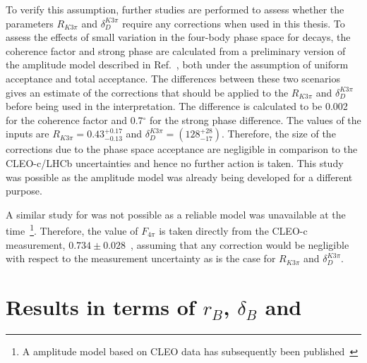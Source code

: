 To verify this assumption, further studies are performed to assess whether the parameters $R_{K3\pi}$ and $\delta_D^{K3\pi}$ require any corrections when used in this thesis. To assess the effects of small variation in the four-body phase space for \kpipipi decays, the coherence factor and strong phase are calculated from a preliminary version of the \decay{\Dz}{\Km\pip\pim\pip} amplitude model described in Ref.~\cite{LHCb-PAPER-2017-040}, both under the assumption of uniform acceptance and total \lhcb acceptance. The differences between these two scenarios gives an estimate of the corrections that should be applied to the $R_{K3\pi}$ and $\delta_D^{K3\pi}$ before being used in the \lhcb interpretation. The difference is calculated to be 0.002 for the coherence factor and 0.7$^{\circ}$ for the strong phase difference. The values of the inputs are $R_{K3\pi} = 0.43^{+0.17}_{-0.13}$ and $\delta_D^{K3\pi} = \left(128^{+28}_{-17}\right)$. Therefore, the size of the corrections due to the \lhcb phase space acceptance are negligible in comparison to the CLEO-c/LHCb uncertainties and hence no further action is taken. This study was possible as the \decay{\Dz}{\Km\pip\pim\pip} amplitude model was already being developed for a different purpose.

A similar study for \decay{\Dz}{\pim\pip\pim\pip} was not possible as a reliable model was unavailable at the time~\footnote{A \decay{\Dz}{\pim\pip\pim\pip} amplitude model based on CLEO data has subsequently been published~\cite{4piamplitude}}. Therefore, the value of $F_{4\pi}$ is taken directly from the CLEO-c measurement, $0.734 \pm 0.028$~\cite{charm4pi}, assuming that any correction would be negligible with respect to the measurement uncertainty as is the case for $R_{K3\pi}$ and $\delta_D^{K3\pi}$. 

\section{Results in terms of $r_B$, $\delta_B$ and \Pgamma}
\label{sec:interpretation:gammadini}

